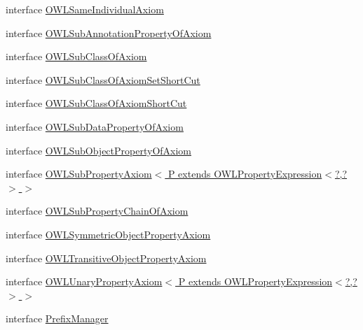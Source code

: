 \begin{DoxyCompactItemize}
\item 
interface \hyperlink{interfaceorg_1_1semanticweb_1_1owlapi_1_1model_1_1_o_w_l_same_individual_axiom}{O\-W\-L\-Same\-Individual\-Axiom}
\item 
interface \hyperlink{interfaceorg_1_1semanticweb_1_1owlapi_1_1model_1_1_o_w_l_sub_annotation_property_of_axiom}{O\-W\-L\-Sub\-Annotation\-Property\-Of\-Axiom}
\item 
interface \hyperlink{interfaceorg_1_1semanticweb_1_1owlapi_1_1model_1_1_o_w_l_sub_class_of_axiom}{O\-W\-L\-Sub\-Class\-Of\-Axiom}
\item 
interface \hyperlink{interfaceorg_1_1semanticweb_1_1owlapi_1_1model_1_1_o_w_l_sub_class_of_axiom_set_short_cut}{O\-W\-L\-Sub\-Class\-Of\-Axiom\-Set\-Short\-Cut}
\item 
interface \hyperlink{interfaceorg_1_1semanticweb_1_1owlapi_1_1model_1_1_o_w_l_sub_class_of_axiom_short_cut}{O\-W\-L\-Sub\-Class\-Of\-Axiom\-Short\-Cut}
\item 
interface \hyperlink{interfaceorg_1_1semanticweb_1_1owlapi_1_1model_1_1_o_w_l_sub_data_property_of_axiom}{O\-W\-L\-Sub\-Data\-Property\-Of\-Axiom}
\item 
interface \hyperlink{interfaceorg_1_1semanticweb_1_1owlapi_1_1model_1_1_o_w_l_sub_object_property_of_axiom}{O\-W\-L\-Sub\-Object\-Property\-Of\-Axiom}
\item 
interface \hyperlink{interfaceorg_1_1semanticweb_1_1owlapi_1_1model_1_1_o_w_l_sub_property_axiom_3_01_p_01extends_01_4e9c27ceb4f20c2d0b269e98d8cfdaa5}{O\-W\-L\-Sub\-Property\-Axiom$<$ P extends O\-W\-L\-Property\-Expression$<$?,?$>$ $>$}
\item 
interface \hyperlink{interfaceorg_1_1semanticweb_1_1owlapi_1_1model_1_1_o_w_l_sub_property_chain_of_axiom}{O\-W\-L\-Sub\-Property\-Chain\-Of\-Axiom}
\item 
interface \hyperlink{interfaceorg_1_1semanticweb_1_1owlapi_1_1model_1_1_o_w_l_symmetric_object_property_axiom}{O\-W\-L\-Symmetric\-Object\-Property\-Axiom}
\item 
interface \hyperlink{interfaceorg_1_1semanticweb_1_1owlapi_1_1model_1_1_o_w_l_transitive_object_property_axiom}{O\-W\-L\-Transitive\-Object\-Property\-Axiom}
\item 
interface \hyperlink{interfaceorg_1_1semanticweb_1_1owlapi_1_1model_1_1_o_w_l_unary_property_axiom_3_01_p_01extends_00525a6a5c0650422f5411551b03037a5}{O\-W\-L\-Unary\-Property\-Axiom$<$ P extends O\-W\-L\-Property\-Expression$<$?,?$>$ $>$}
\item 
interface \hyperlink{interfaceorg_1_1semanticweb_1_1owlapi_1_1model_1_1_prefix_manager}{Prefix\-Manager}

\end{DoxyCompactItemize}
